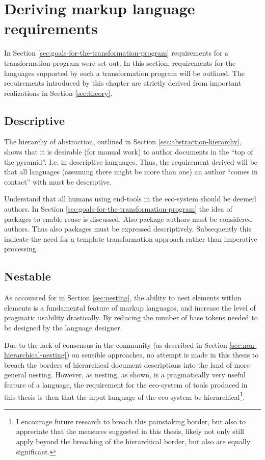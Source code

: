 \documentclass{scrreprt}
\begin{document}
%
%
%
%
%
%


\chapter{Deriving markup language requirements}
\label{chpt:derived-language-requirements}
In Section \ref{sec:goals-for-the-transformation-program} requirements for a transformation program were set out. In this section, requirements for the languages supported by such a transformation program will be outlined. The requirements introduced by this chapter are strictly derived from important realizations in Section \ref{sec:theory}.


\section{Descriptive}
The hierarchy of abstraction, outlined in Section \ref{sec:abstraction-hierarchy}, shows that it is desirable (for manual work) to author documents in the ``top of the pyramid''. I.e. in descriptive languages. Thus, the requirement derived will be that all languages (assuming there might be more than one) an author ``comes in contact'' with must be descriptive.

Understand that all humans using end-tools in the eco-system should be deemed authors. In Section \ref{sec:goals-for-the-transformation-program} the idea of packages to enable reuse is discussed. Also package authors must be considered authors. Thus also packages must be expressed descriptively. Subsequently this indicate the need for a template transformation approach rather than imperative processing.



\section{Nestable}
As accounted for in Section \ref{sec:nesting}, the ability to nest elements within elements is a fundamental feature of markup languages, and increase the level of pragmatic usability drastically. By reducing the number of base tokens needed to be designed by the language designer.

Due to the lack of consensus in the community (as described in Section \ref{sec:non-hierarchical-nesting}) on sensible approaches, no attempt is made in this thesis to breach the borders of hierarchical document descriptions into the land of more general nesting. However, as nesting, as shown, is a pragmatically very useful feature of a language, the requirement for the eco-system of tools produced in this thesis is then that the input language of the eco-system be hierarchical\footnote{I encourage future research to breach this painstaking border, but also to appreciate that the measures suggested in this thesis, likely not only still apply beyond the breaching of the hierarchical border, but also are equally significant.}.
\end{document}
